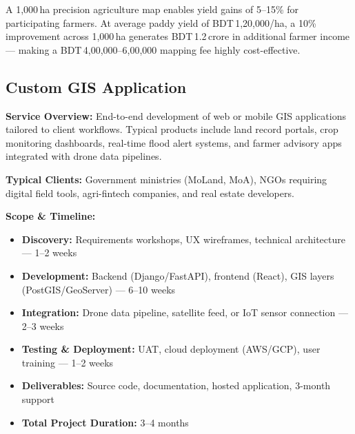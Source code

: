\begin{successbox}
    A 1,000\,ha precision agriculture map enables yield gains of 5--15\% for participating farmers. At average paddy yield of BDT\,1,20,000/ha, a 10\% improvement across 1,000\,ha generates BDT\,1.2\,crore in additional farmer income --- making a BDT\,4,00,000--6,00,000 mapping fee highly cost-effective.
\end{successbox}


\subsection{Custom GIS Application}

\textbf{Service Overview:} End-to-end development of web or mobile GIS applications tailored to client workflows. Typical products include land record portals, crop monitoring dashboards, real-time flood alert systems, and farmer advisory apps integrated with drone data pipelines.

\textbf{Typical Clients:} Government ministries (MoLand, MoA), NGOs requiring digital field tools, agri-fintech companies, and real estate developers.

\textbf{Scope \& Timeline:}
\begin{itemize}
    \item \textbf{Discovery:} Requirements workshops, UX wireframes, technical architecture --- 1--2 weeks
    \item \textbf{Development:} Backend (Django/FastAPI), frontend (React), GIS layers (PostGIS/GeoServer) --- 6--10 weeks
    \item \textbf{Integration:} Drone data pipeline, satellite feed, or IoT sensor connection --- 2--3 weeks
    \item \textbf{Testing \& Deployment:} UAT, cloud deployment (AWS/GCP), user training --- 1--2 weeks
    \item \textbf{Deliverables:} Source code, documentation, hosted application, 3-month support
    \item \textbf{Total Project Duration:} 3--4 months
\end{itemize}

